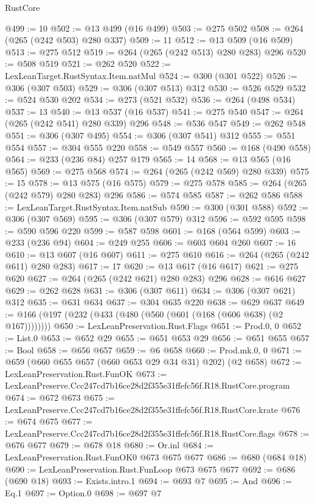 \begin{lexlean}{RustCore}
\begin{coremodule}
@499 := 10
@502 := @13 @499 (@16 @499)
@503 := @275 @502
@508 := @264 (@265 (@242 @503) @280 @337)
@509 := 11
@512 := @13 @509 (@16 @509)
@513 := @275 @512
@519 := @264 (@265 (@242 @513) @280 @283) @296
@520 := @508 @519
@521 := @262 @520
@522 := LexLeanTarget.RustSyntax.Item.natMul
@524 := @300 (@301 @522)
@526 := @306 (@307 @503)
@529 := @306 (@307 @513) @312
@530 := @526 @529
@532 := @524 @530 @202
@534 := @273 (@521 @532)
@536 := @264 (@498 @534)
@537 := 13
@540 := @13 @537 (@16 @537)
@541 := @275 @540
@547 := @264 (@265 (@242 @541) @280 @339) @296
@548 := @536 @547
@549 := @262 @548
@551 := @306 (@307 @495)
@554 := @306 (@307 @541) @312
@555 := @551 @554
@557 := @304 @555 @220
@558 := @549 @557
@560 := @168 (@490 @558)
@564 := @233 (@236 @84) @257 @179
@565 := 14
@568 := @13 @565 (@16 @565)
@569 := @275 @568
@574 := @264 (@265 (@242 @569) @280 @339)
@575 := 15
@578 := @13 @575 (@16 @575)
@579 := @275 @578
@585 := @264 (@265 (@242 @579) @280 @283) @296
@586 := @574 @585
@587 := @262 @586
@588 := LexLeanTarget.RustSyntax.Item.natSub
@590 := @300 (@301 @588)
@592 := @306 (@307 @569)
@595 := @306 (@307 @579) @312
@596 := @592 @595
@598 := @590 @596 @220
@599 := @587 @598
@601 := @168 (@564 @599)
@603 := @233 (@236 @94)
@604 := @249 @255
@606 := @603 @604 @260
@607 := 16
@610 := @13 @607 (@16 @607)
@611 := @275 @610
@616 := @264 (@265 (@242 @611) @280 @283)
@617 := 17
@620 := @13 @617 (@16 @617)
@621 := @275 @620
@627 := @264 (@265 (@242 @621) @280 @283) @296
@628 := @616 @627
@629 := @262 @628
@631 := @306 (@307 @611)
@634 := @306 (@307 @621) @312
@635 := @631 @634
@637 := @304 @635 @220
@638 := @629 @637
@649 := @166 (@197 (@232 (@433 (@480 (@560 (@601 (@168 (@606 @638) (@2 @167))))))))
@650 := LexLeanPreservation.Rust.Flags
@651 := Prod.{0, 0}
@652 := List.{0}
@653 := @652 @29
@655 := @651 @653 @29
@656 := @651 @655
@657 := Bool
@658 := @656 @657
@659 := @6 @658
@660 := Prod.mk.{0, 0}
@671 := @659 (@660 @655 @657 (@660 @653 @29 @34 @31) @202) (@2 @658)
@672 := LexLeanPreservation.Rust.FunOK
@673 := LexLeanPreserve.Ccc247cd7b16ce28d2f355e31ffefc56f.R18.RustCore.program
@674 := @672 @673
@675 := LexLeanPreserve.Ccc247cd7b16ce28d2f355e31ffefc56f.R18.RustCore.krate
@676 := @674 @675
@677 := LexLeanPreserve.Ccc247cd7b16ce28d2f355e31ffefc56f.R18.RustCore.flags
@678 := @676 @677
@679 := @678 @18
@680 := Or.inl
@684 := LexLeanPreservation.Rust.FunOK0 @673 @675 @677
@686 := @680 (@684 @18)
@690 := LexLeanPreservation.Rust.FunLoop @673 @675 @677
@692 := @686 (@690 @18)
@693 := Exists.intro.{1}
@694 := @693 @7
@695 := And
@696 := Eq.{1}
@697 := Option.{0}
@698 := @697 @7

\end{coremodule}
\end{lexlean}
